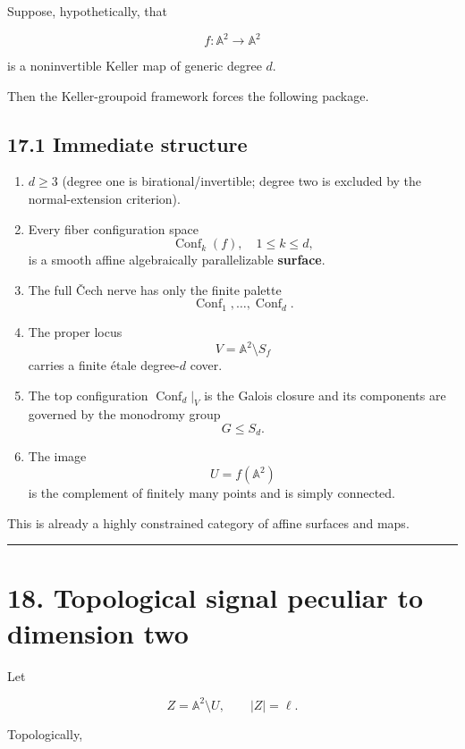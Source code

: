 Suppose, hypothetically, that

\[
f\colon\mathbb A^2\to\mathbb A^2
\]

is a noninvertible Keller map of generic degree \(d\).

Then the Keller-groupoid framework forces the following package.

\subsection{17.1 Immediate structure}\label{immediate-structure}

\begin{enumerate}
\def\labelenumi{\arabic{enumi}.}
\tightlist
\item
  \(d\ge3\) (degree one is birational/invertible; degree two is excluded
  by the normal-extension criterion).
\item
  Every fiber configuration space \[
  \operatorname{Conf}_k(f),\quad 1\le k\le d,
  \] is a smooth affine algebraically parallelizable \textbf{surface}.
\item
  The full Čech nerve has only the finite palette \[
  \operatorname{Conf}_1,\dots,\operatorname{Conf}_d.
  \]
\item
  The proper locus \[
  V=\mathbb A^2\setminus S_f
  \] carries a finite étale degree-\(d\) cover.
\item
  The top configuration \(\operatorname{Conf}_d|_V\) is the Galois
  closure and its components are governed by the monodromy group \[
  G\le S_d.
  \]
\item
  The image \[
  U=f(\mathbb A^2)
  \] is the complement of finitely many points and is simply connected.
\end{enumerate}

This is already a highly constrained category of affine surfaces and
maps.

\begin{center}\rule{0.5\linewidth}{0.5pt}\end{center}

\section{18. Topological signal peculiar to dimension
two}\label{topological-signal-peculiar-to-dimension-two}

Let

\[
Z=\mathbb A^2\setminus U,
\qquad |Z|=\ell.
\]

Topologically,

